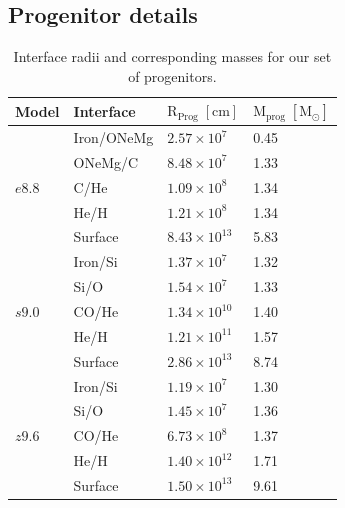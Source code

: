 \documentclass[fleqn,usenatbib]{mnras}
\begin{document}
\begin{appendices}
\section{Progenitor details}

\begin{table}
   \begin{tabular}{l l l l} 
   \hline
     Model      &Interface & $\mathrm{R_{Prog}\;[cm]}$ & $\mathrm{M_{prog}\;[M_{\odot}]}$ \\ [0.5ex] 
   \hline
   \multirow{5}{*}{$e8.8$} & Iron/ONeMg & $2.57\times 10^{7}$  & 0.45  \\ 
                           & ONeMg/C 	& $8.48\times 10^{7}$  & 1.33 \\
                           & C/He 		& $1.09\times 10^{8}$  & 1.34\\
                           & He/H 		& $1.21\times 10^{8}$  & 1.34  \\
                           & Surface 	& $8.43\times 10^{13}$ & 5.83  \\
   \hline
   \multirow{5}{*}{$s9.0$} & Iron/Si    & $1.37\times 10^{7}$   & 1.32  \\ 
                           & Si/O       & $1.54\times 10^{7}$  & 1.33  \\ 
                           & CO/He 		& $1.34\times 10^{10}$  & 1.40 \\
                           & He/H 	    & $1.21\times 10^{11}$ & 1.57 \\
                           & Surface 	& $2.86\times 10^{13}$  & 8.74  \\
   \hline
   \multirow{5}{*}{$z9.6$} & Iron/Si    & $1.19\times 10^{7}$  & 1.30  \\ 
                           & Si/O       & $1.45\times 10^{7}$  & 1.36  \\ 
                           & CO/He 		& $6.73\times 10^{8}$  & 1.37 \\
                           & He/H 	    & $1.40\times 10^{12}$ & 1.71\\
                           & Surface	& $1.50\times 10^{13}$ & 9.61  \\
   \end{tabular}
   \caption{Interface radii and corresponding masses for our set of progenitors.}
   \label{tab:progenitors}
\end{table}


\end{appendices}
\end{document}
